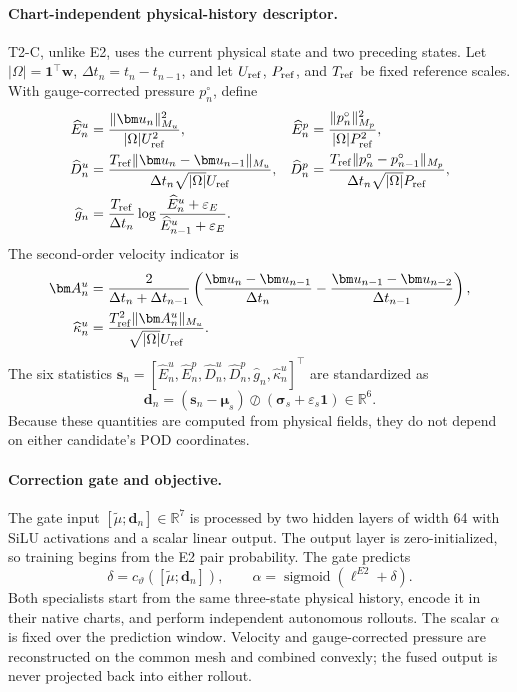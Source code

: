 \paragraph{Chart-independent physical-history descriptor.}
T2-C, unlike E2, uses the current physical state and two preceding states.
Let $|\Omega|=\bm 1^\top\bm w$, $\Delta t_n=t_n-t_{n-1}$, and let
$U_{\rm ref}$, $P_{\rm ref}$, and $T_{\rm ref}$ be fixed reference scales.
With gauge-corrected pressure $p_n^\circ$, define
\begin{align}
 \widehat E_n^u&=\frac{\|\bm u_n\|_{M_u}^2}{|\Omega|U_{\rm ref}^2},
 &\widehat E_n^p&=\frac{\|p_n^\circ\|_{M_p}^2}{|\Omega|P_{\rm ref}^2},\label{eq:app_t2c_energy}\\
 \widehat D_n^u&=\frac{T_{\rm ref}\|\bm u_n-\bm u_{n-1}\|_{M_u}}
 {\Delta t_n\sqrt{|\Omega|}U_{\rm ref}},
 &\widehat D_n^p&=\frac{T_{\rm ref}\|p_n^\circ-p_{n-1}^\circ\|_{M_p}}
 {\Delta t_n\sqrt{|\Omega|}P_{\rm ref}},\label{eq:app_t2c_rate}\\
 \widehat g_n&=\frac{T_{\rm ref}}{\Delta t_n}
 \log\frac{\widehat E_n^u+\varepsilon_E}{\widehat E_{n-1}^u+\varepsilon_E}.
 \label{eq:app_t2c_growth}
\end{align}
The second-order velocity indicator is
\begin{align}
 \bm A_n^u&=\frac{2}{\Delta t_n+\Delta t_{n-1}}
 \left(\frac{\bm u_n-\bm u_{n-1}}{\Delta t_n}
 -\frac{\bm u_{n-1}-\bm u_{n-2}}{\Delta t_{n-1}}\right),\\
 \widehat\kappa_n^u&=
 \frac{T_{\rm ref}^2\|\bm A_n^u\|_{M_u}}
 {\sqrt{|\Omega|}U_{\rm ref}}.
 \label{eq:app_t2c_curvature}
\end{align}
The six statistics
$\bm s_n=[\widehat E_n^u,\widehat E_n^p,\widehat D_n^u,
\widehat D_n^p,\widehat g_n,\widehat\kappa_n^u]^\top$ are standardized as
\begin{equation}
 \bm d_n=(\bm s_n-\bm\mu_s)\oslash
 (\bm\sigma_s+\varepsilon_s\bm 1)\in\mathbb R^6.
 \label{eq:app_t2c_descriptor}
\end{equation}
Because these quantities are computed from physical fields, they do not
depend on either candidate's POD coordinates.

\paragraph{Correction gate and objective.}
The gate input $[\widetilde\mu;\bm d_n]\in\mathbb R^7$ is processed by two
hidden layers of width 64 with SiLU activations and a scalar linear output.
The output layer is zero-initialized, so training begins from the E2 pair
probability. The gate predicts
\begin{equation}
 \delta=c_\vartheta([\widetilde\mu;\bm d_n]),\qquad
 \alpha=\operatorname{sigmoid}(\ell^{E2}+\delta).
 \label{eq:app_t2c_gate}
\end{equation}
Both specialists start from the same three-state physical history, encode it
in their native charts, and perform independent autonomous rollouts. The
scalar $\alpha$ is fixed over the prediction window. Velocity and
gauge-corrected pressure are reconstructed on the common mesh and combined
convexly; the fused output is never projected back into either rollout.


